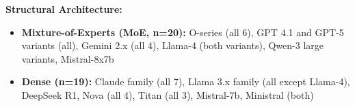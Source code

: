 \documentclass{article}
\begin{document}
\textbf{Structural Architecture:}
\begin{itemize}[itemsep=2pt,topsep=3pt,parsep=0pt]
    \item \textbf{Mixture-of-Experts (MoE, n=20):} O-series (all 6), GPT 4.1 and GPT-5 variants (all), Gemini 2.x (all 4), Llama-4 (both variants), Qwen-3 large variants, Mistral-8x7b
    \item \textbf{Dense (n=19):} Claude family (all 7), Llama 3.x family (all except Llama-4), DeepSeek R1, Nova (all 4), Titan (all 3), Mistral-7b, Ministral (both)
\end{itemize}



\end{document}
